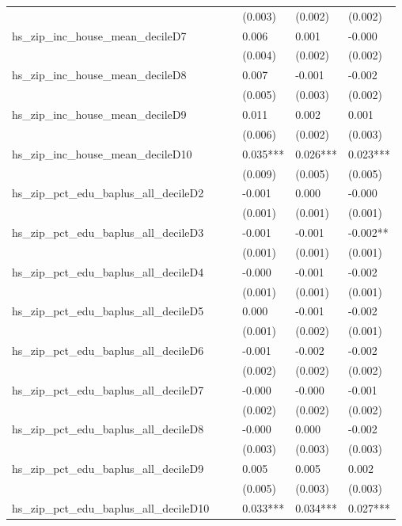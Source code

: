 \begin{longtable}[t]{llllll}
\addlinespace
 &  &  & (0.003) & (0.002) & (0.002)\\
hs\_zip\_inc\_house\_mean\_decileD7 &  &  & 0.006 & 0.001 & -0.000\\
 &  &  & (0.004) & (0.002) & (0.002)\\
hs\_zip\_inc\_house\_mean\_decileD8 &  &  & 0.007 & -0.001 & -0.002\\
 &  &  & (0.005) & (0.003) & (0.002)\\
\addlinespace
hs\_zip\_inc\_house\_mean\_decileD9 &  &  & 0.011 & 0.002 & 0.001\\
 &  &  & (0.006) & (0.002) & (0.003)\\
hs\_zip\_inc\_house\_mean\_decileD10 &  &  & 0.035*** & 0.026*** & 0.023***\\
 &  &  & (0.009) & (0.005) & (0.005)\\
hs\_zip\_pct\_edu\_baplus\_all\_decileD2 &  &  & -0.001 & 0.000 & -0.000\\
\addlinespace
 &  &  & (0.001) & (0.001) & \vphantom{2} (0.001)\\
hs\_zip\_pct\_edu\_baplus\_all\_decileD3 &  &  & -0.001 & -0.001 & -0.002**\\
 &  &  & (0.001) & (0.001) & \vphantom{1} (0.001)\\
hs\_zip\_pct\_edu\_baplus\_all\_decileD4 &  &  & -0.000 & -0.001 & -0.002\\
 &  &  & (0.001) & (0.001) & (0.001)\\
\addlinespace
hs\_zip\_pct\_edu\_baplus\_all\_decileD5 &  &  & 0.000 & -0.001 & -0.002\\
 &  &  & (0.001) & (0.002) & (0.001)\\
hs\_zip\_pct\_edu\_baplus\_all\_decileD6 &  &  & -0.001 & -0.002 & -0.002\\
 &  &  & (0.002) & (0.002) & \vphantom{1} (0.002)\\
hs\_zip\_pct\_edu\_baplus\_all\_decileD7 &  &  & -0.000 & -0.000 & -0.001\\
\addlinespace
 &  &  & (0.002) & (0.002) & (0.002)\\
hs\_zip\_pct\_edu\_baplus\_all\_decileD8 &  &  & -0.000 & 0.000 & -0.002\\
 &  &  & (0.003) & (0.003) & (0.003)\\
hs\_zip\_pct\_edu\_baplus\_all\_decileD9 &  &  & 0.005 & 0.005 & 0.002\\
 &  &  & (0.005) & (0.003) & (0.003)\\
\addlinespace
hs\_zip\_pct\_edu\_baplus\_all\_decileD10 &  &  & 0.033*** & 0.034*** & 0.027***\\

\end{longtable}
